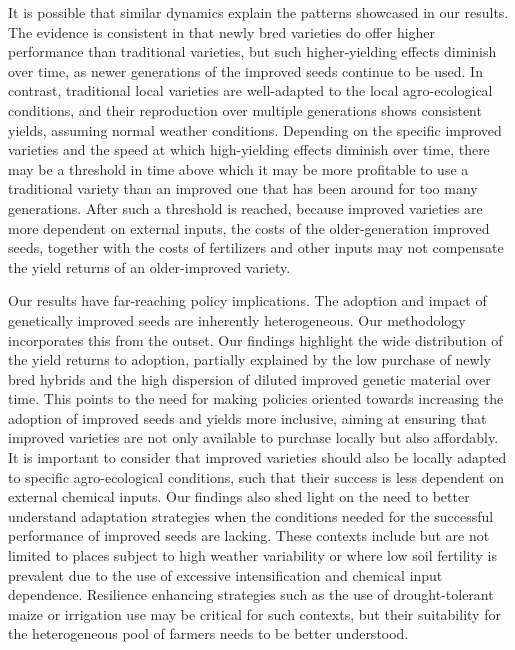 \documentclass[11pt]{article}
\begin{document}
It is possible that similar dynamics explain the patterns showcased in our results. The evidence is consistent in that newly bred varieties do offer higher performance than traditional varieties, but such higher-yielding effects diminish over time, as newer generations of the improved seeds continue to be used. In contrast, traditional local varieties are well-adapted to the local agro-ecological conditions, and their reproduction over multiple generations shows consistent yields, assuming normal weather conditions. Depending on the specific improved varieties and the speed at which high-yielding effects diminish over time, there may be a threshold in time above which it may be more profitable to use a traditional variety than an improved one that has been around for too many generations. After such a threshold is reached, because improved varieties are more dependent on external inputs, the costs of the older-generation improved seeds, together with the costs of fertilizers and other inputs may not compensate the yield returns of an older-improved variety. \par

Our results have far-reaching policy implications. The adoption and impact of genetically improved seeds are inherently heterogeneous. Our methodology incorporates this from the outset. Our findings highlight the wide distribution of the yield returns to adoption, partially explained by the low purchase of newly bred hybrids and the high dispersion of diluted improved genetic material over time. This points to the need for making policies oriented towards increasing the adoption of improved seeds and yields more inclusive, aiming at ensuring that improved varieties are not only available to purchase locally but also affordably. It is important to consider that improved varieties should also be locally adapted to specific agro-ecological conditions, such that their success is less dependent on external chemical inputs. Our findings also shed light on the need to better understand adaptation strategies when the conditions needed for the successful performance of improved seeds are lacking. These contexts include but are not limited to places subject to high weather variability or where low soil fertility is prevalent due to the use of excessive intensification and chemical input dependence. Resilience enhancing strategies such as the use of drought-tolerant maize or irrigation use may be critical for such contexts, but their suitability for the heterogeneous pool of farmers needs to be better understood. 









\end{document}
